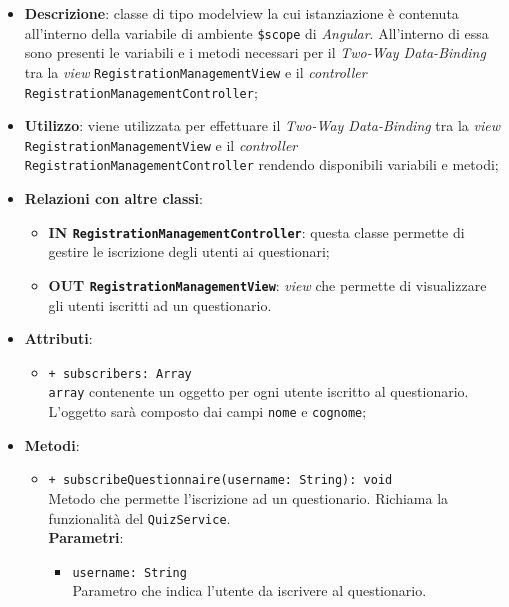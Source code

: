 	\begin{itemize}
		\item \textbf{Descrizione}: classe di tipo modelview la cui istanziazione è contenuta all'interno della variabile di ambiente \texttt{\$scope} di \textit{Angular}. All'interno di essa sono presenti le variabili e i metodi necessari per il \textit{Two-Way Data-Binding} tra la \textit{view} \texttt{RegistrationManagementView} e il \textit{controller} \texttt{RegistrationManagementController};
		\item \textbf{Utilizzo}: viene utilizzata per effettuare il \textit{Two-Way Data-Binding} tra la \textit{view}\\ \texttt{RegistrationManagementView} e il \textit{controller} \texttt{RegistrationManagementController} rendendo disponibili variabili e metodi;
		\item \textbf{Relazioni con altre classi}: 
		\begin{itemize}
			\item \textbf{IN \texttt{RegistrationManagementController}}: questa classe permette di gestire le iscrizione degli utenti ai questionari;
			\item \textbf{OUT \texttt{RegistrationManagementView}}: \textit{view} che permette di visualizzare gli utenti iscritti ad un questionario.
		\end{itemize}
		\item \textbf{Attributi}: 
		\begin{itemize}
			\item \texttt{+ subscribers: Array} \\ \texttt{array} contenente un oggetto per ogni utente iscritto al questionario. L'oggetto sarà composto dai campi \texttt{nome} e \texttt{cognome};
		\end{itemize}
		\item \textbf{Metodi}: 
		\begin{itemize}
			\item \texttt{+ subscribeQuestionnaire(username: String): void} \\ Metodo che permette l'iscrizione ad un questionario. Richiama la funzionalità del \texttt{QuizService}. \\
			\textbf{Parametri}:
			\begin{itemize}
				\item \texttt{username: String}\\
				Parametro che indica l'utente da iscrivere al questionario.
			\end{itemize}
		\end{itemize}
	\end{itemize}
	
	